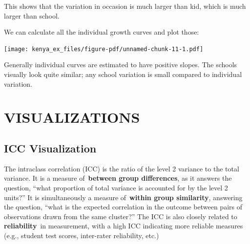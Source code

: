 \documentclass[
  letterpaper,
  DIV=11,
  numbers=noendperiod]{scrreprt}
\newenvironment{Shaded}{}{}
\newcommand{\AttributeTok}[1]{\textcolor[rgb]{0.49,0.56,0.16}{#1}}
\newcommand{\FloatTok}[1]{\textcolor[rgb]{0.25,0.63,0.44}{#1}}
\newcommand{\FunctionTok}[1]{\textcolor[rgb]{0.02,0.16,0.49}{#1}}
\newcommand{\NormalTok}[1]{#1}
\newcommand{\OtherTok}[1]{\textcolor[rgb]{0.00,0.44,0.13}{#1}}
\newcommand{\SpecialCharTok}[1]{\textcolor[rgb]{0.25,0.44,0.63}{#1}}
\begin{document}
This shows that the variation in occasion is much larger than kid, which
is much larger than school.

We can calculate all the individual growth curves and plot those:

\begin{Shaded}
\end{Shaded}

\texttt{[image: kenya\_ex\_files/figure-pdf/unnamed-chunk-11-1.pdf]}

Generally individual curves are estimated to have positive slopes. The
schools visually look quite similar; any school variation is small
compared to individual variation.

\part{VISUALIZATIONS}

\chapter{ICC Visualization}\label{icc-visualization}

The intraclass correlation (ICC) is the ratio of the level 2 variance to
the total variance. It is a measure of~\textbf{between group
differences}, as it answers the question, ``what proportion of total
variance is accounted for by the level 2 units?'' It is simultaneously a
measure of~\textbf{within group similarity}, answering the question,
``what is the expected correlation in the outcome between pairs of
observations drawn from the same cluster?'' The ICC is also closely
related to \textbf{reliability}~in measurement, with a high ICC
indicating more reliable measures (e.g., student test scores,
inter-rater reliability, etc.)
\end{document}
